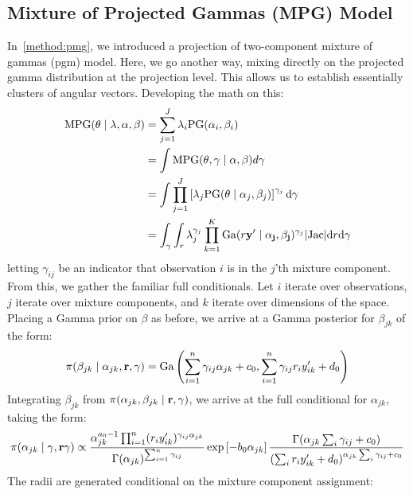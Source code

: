 \subsection{Mixture of Projected Gammas (MPG) Model}
\label{method:mpg}
  In~\ref{method:pmg}, we introduced a projection of two-component mixture of
  gammas (pgm) model.  Here, we go another way, mixing directly on the projected
  gamma distribution at the projection level.  This allows us to establish
  essentially clusters of angular vectors.  Developing the math on this:
\begin{align}
\text{MPG}({\bf \theta}\mid {\bf \lambda}, {\bf \alpha}, {\bf \beta}) &= \sum_{j = 1}^J\lambda_i\text{PG}(\alpha_i,\beta_i) \nonumber \\
&= \int \text{MPG}({\bf \theta}, {\bf \gamma} \mid{\bf \alpha},{\bf \beta})d\gamma \nonumber \\
&= \int \prod_{j = 1}^J\left[\lambda_j\text{PG}({\bf \theta}\mid\alpha_j,\beta_j)\right]^{\gamma_j}\text{d}\gamma \\
&= \int_{\gamma}\int_{r}\lambda_j^{\gamma_j}\prod_{k = 1}^K\text{Ga}(r{\bf y}^{\prime}\mid{\bf \alpha_j},{\bf \beta_j})^{\gamma_j}\lvert\text{Jac}\rvert \text{d}r\text{d}\gamma
\end{align}
letting $\gamma_{ij}$ be an indicator that observation $i$ is in the $j$'th
  mixture component.  From this, we gather the familiar full conditionals.  Let
  $i$ iterate over observations, $j$ iterate over mixture components, and $k$
  iterate over dimensions of the space. Placing a Gamma prior on $\beta$ as
  before, we arrive at a Gamma posterior for $\beta_{jk}$ of the form:
\begin{equation}
  \pi(\beta_{jk}\mid\alpha_{jk}, {\bf r}, {\bf \gamma}) = \text{Ga}\left(\sum_{i = 1}^n \gamma_{ij}\alpha_{jk} + c_0,\sum_{i = 1}^n\gamma_{ij}r_iy_{ik}^{\prime} + d_0\right)
\end{equation}
Integrating $\beta_{jk}$ from $\pi(\alpha_{jk},\beta_{jk}\mid {\bf r}, {\bf \gamma})$,
  we arrive at the full conditional for $\alpha_{jk}$, taking the form:
\begin{equation}
  \pi(\alpha_{jk}\mid\gamma, {\bf r} {\bf \gamma}) \propto \frac{\alpha_{jk}^{a_0 - 1}\prod_{i = 1}^n(r_iy_{ik}^{\prime})^{\gamma_{ij}\alpha_{jk}}}{\Gamma(\alpha_{jk})^{\sum_{i = 1}^n\gamma_{ij}}}\exp\left[-b_0\alpha_{jk}\right]\frac{\Gamma(\alpha_{jk}\sum_i\gamma_{ij} + c_0)}{\left(\sum_ir_iy_{ik}^{\prime} + d_0\right)^{\alpha_{jk}\sum_i\gamma_{ij} + c_0}}
\end{equation}
The radii are generated conditional on the mixture component assignment:
